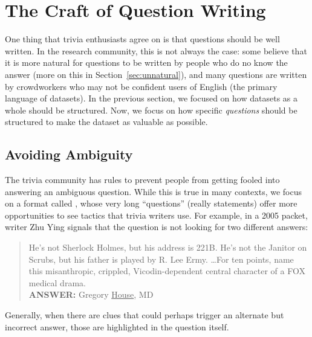 \section{The Craft of Question Writing}
\label{sec:craft}

One thing that trivia enthusiasts agree on is that questions should be well written.
In the research community, this is not always the case: some believe that it is more natural for questions to be written by people who do no know the answer (more on this in Section~\ref{sec:unnatural}), and many questions are written by crowdworkers who may not be confident users of English (the primary language of  datasets).
In the previous section, we focused on how datasets as a whole should be structured.
Now, we focus on how specific \emph{questions} should be structured to make the dataset as valuable as possible.

\subsection{Avoiding Ambiguity}
\label{sec:ambiguity}

The trivia community has rules to prevent people from getting fooled
into answering an ambiguous question.
While this is true in many contexts, we focus on a format called \qb{}, whose very long ``questions'' (really statements) offer more opportunities to see tactics that trivia writers use.
For example, in a 2005  packet, writer Zhu Ying signals that the question is not looking for two different answers:
\begin{quote}
 He's not Sherlock Holmes, but his address is 221B. He's not the Janitor on Scrubs, but his father is played by R. Lee Ermy. \dots For ten points, name this misanthropic, crippled, Vicodin-dependent central character of a FOX medical drama. \\
{\bf ANSWER:} Gregory \underline{House}, MD
\end{quote}
Generally, when there are clues that could perhaps trigger an alternate but incorrect answer, those are highlighted in the question itself.

